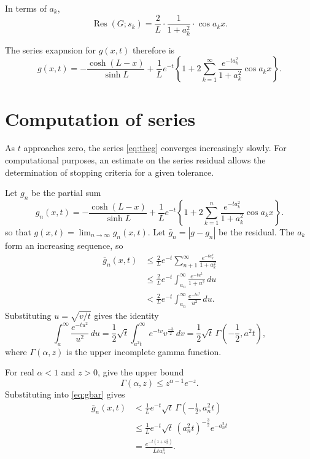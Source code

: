\documentclass[parskip=half]{scrartcl}
\DeclareMathOperator{\Res}{Res}
\begin{document}
In terms of $a_k$,
\begin{equation}
    \Res(G; s_k) = \frac{2}{L}\cdot\frac{1}{1+a_k^2}\cdot\cos a_kx.
\end{equation}

The series exapnsion for $g(x, t)$ therefore is
\begin{equation}
    g(x, t) = -\frac{\cosh(L-x)}{\sinh L} + \frac{1}{L}e^{-t}\left\{
        1+2\sum_{k=1}^\infty \frac{e^{-ta_k^2}}{1+a_k^2}\cos a_k x\right\}.
    \label{eq:theg}
\end{equation}

\section{Computation of series}

As $t$ approaches zero, the series \eqref{eq:theg} converges increasingly slowly.
For computational purposes, an estimate on the series residual allows the determination
of stopping criteria for a given tolerance.

Let $g_n$ be the partial sum
\begin{equation}
    g_n(x, t) = -\frac{\cosh(L-x)}{\sinh L} + \frac{1}{L}e^{-t}\left\{
        1+2\sum_{k=1}^n \frac{e^{-ta_k^2}}{1+a_k^2}\cos a_k x\right\}.
\end{equation}
so that $g(x, t) =\lim_{n\to\infty} g_n(x,t)$. Let $\bar{g}_n = |g-g_n|$ be the
residual. The $a_k$ form an increasing sequence, so
\begin{equation}
    \begin{aligned}
        \bar{g}_n(x,t)
            & \leq \frac{2}{L}e^{-t}\sum_{n+1}^\infty\frac{e^{-ta_k^2}}{1+a_k^2}\\
            & \leq \frac{2}{L}e^{-t}\int_{a_n}^\infty \frac{e^{-tu^2}}{1+u^2}\,du\\
            & < \frac{2}{L}e^{-t}\int_{a_n}^\infty \frac{e^{-tu^2}}{u^2}\,du.
    \end{aligned}
    \label{eq:gbar}
\end{equation}
Substituting $u=\sqrt{v/t}$ gives the identity
\begin{equation}
    \int_{a}^\infty \frac{e^{-tu^2}}{u^2}\,du
    = \frac{1}{2}\sqrt{t}\int_{a^2t}^\infty e^{-tv} v^{\frac{-3}{2}}\,dv
    = \frac{1}{2}\sqrt{t}\,\Gamma(-\frac{1}{2},a^2 t),
\end{equation}
where $\Gamma(\alpha, z)$ is the upper incomplete gamma function.

For real $\alpha<1$ and $z>0$, \textcite[][Theorem 2.3]{borwein2009} give the upper bound
\[
    \Gamma(\alpha, z) \leq z^{\alpha-1} e^{-z}.
\]
Substituting into \eqref{eq:gbar} gives
\begin{equation}
    \begin{aligned}
        \bar{g}_n(x,t)
            & < \frac{1}{L}e^{-t}\sqrt{t}\,\Gamma(-\frac{1}{2},a_n^2 t) \\
            & \leq \frac{1}{L}e^{-t}\sqrt{t}\,(a_n^2 t)^{-\frac{3}{2}}e^{-a_n^2t} \\
            & = \frac{e^{-t(1+a_n^2)}}{L t a_n^3}.
    \end{aligned}
\end{equation}

\printbibliography
\end{document}
